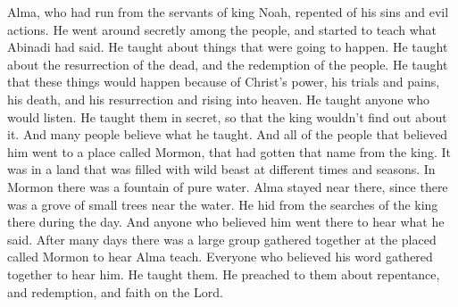 Alma, who had run from the servants of king Noah, repented of his sins and evil actions. He went around secretly among the people, and started to teach what Abinadi had said.
\bverse \iffalse Yea, concerning that which was to come, and also concerning the resurrection of the dead, and the redemption of the people, which was to be brought to pass through the power, and sufferings, and death of Christ, and his resurrection and ascension into heaven. \fi
He taught about things that were going to happen. He taught about the resurrection of the dead, and the redemption of the people. He taught that these things would happen because of Christ's power, his trials and pains, his death, and his resurrection and rising into heaven.
\bverse \iffalse And as many as would hear his word he did teach. And he taught them privately, that it might not come to the knowledge of the king. And many did believe his words. \fi
He taught anyone who would listen. He taught them in secret, so that the king wouldn't find out about it. And many people believe what he taught.
\bverse \iffalse And it came to pass that as many as did believe him did go forth to a place which was called Mormon, having received its name from the king, being in the borders of the land having been infested, by times or at seasons, by wild beasts. \fi
And all of the people that believed him went to a place called Mormon, that had gotten that name from the king. It was in a land that was filled with wild beast at different times and seasons.
\bverse \iffalse Now, there was in Mormon a fountain of pure water, and Alma resorted thither, there being near the water a thicket of small trees, where he did hide himself in the daytime from the searches of the king. \fi
In Mormon there was a fountain of pure water. Alma stayed near there, since there was a grove of small trees near the water. He hid from the searches of the king there during the day.
\bverse \iffalse And it came to pass that as many as believed him went thither to hear his words. \fi
And anyone who believed him went there to hear what he said.
\bverse \iffalse And it came to pass after many days there were a goodly number gathered together at the place of Mormon, to hear the words of Alma. Yea, all were gathered together that believed on his word, to hear him. And he did teach them, and did preach unto them repentance, and redemption, and faith on the Lord. \fi
After many days there was a large group gathered together at the placed called Mormon to hear Alma teach. Everyone who believed his word gathered together to hear him. He taught them. He preached to them about repentance, and redemption, and faith on the Lord.
